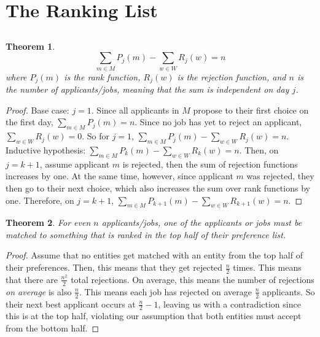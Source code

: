 \documentclass{article}
\newtheorem{theorem}{Theorem}
\begin{document}
\section{The Ranking List}

\subsection{}

\begin{theorem}
    \begin{equation}
        \sum_{m \in M} P_j(m) - \sum_{w \in W} R_j(w) = n
    \end{equation}
    where \(P_j(m)\) is the rank function, \(R_j(w)\) is the rejection function, and \(n\) is the number of applicants/jobs, meaning that the sum is independent on day \(j\).
\end{theorem}
\begin{proof}
    Base case: \(j = 1\).
    Since all applicants in \(M\) propose to their first choice on the first day, \(\sum_{m \in M} P_j(m) = n\).
    Since no job has yet to reject an applicant, \(\sum_{w \in W} R_j(w) = 0\).
    So for \(j = 1\), \(\sum_{m \in M} P_j(m) - \sum_{w \in W} R_j(w) = n\).
    Inductive hypothesis: \(\sum_{m \in M} P_k(m) - \sum_{w \in W} R_k(w) = n\).
    Then, on \(j = k + 1\), assume applicant \(m\) is rejected, then the sum of rejection functions increases by one.
    At the same time, however, since applicant \(m\) was rejected, they then go to their next choice, which also increases the sum over rank functions by one.
    Therefore, on \(j = k + 1\), \(\sum_{m \in M} P_{k + 1}(m) - \sum_{w \in W} R_{k + 1}(w) = n\).
\end{proof}

\begin{theorem}
    For even \(n\) applicants/jobs, one of the applicants or jobs must be matched to something that is ranked in the top half of their preference list.
\end{theorem}
\begin{proof}
    Assume that no entities get matched with an entity from the top half of their preferences.
    Then, this means that they get rejected \(\frac{n}{2}\) times.
    This means that there are \(\frac{n^2}{2}\) total rejections.
    On average, this means the number of rejections \emph{on average} is also \(\frac{n}{2}\).
    This means each job has rejected on average \(\frac{n}{2}\) applicants.
    So their next best applicant occurs at \(\frac{n}{2} - 1\), leaving us with a contradiction since this is at the top half, violating our assumption that both entities must accept from the bottom half.
\end{proof}
\end{document}

